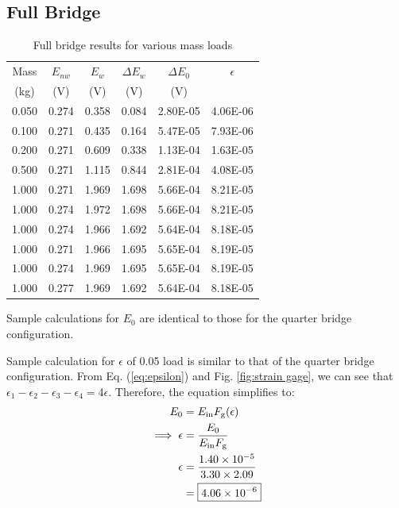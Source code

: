 \subsection{Full Bridge}

\begin{table}[h]
    \centering
    \caption{Full bridge results for various mass loads}
    \label{tab:Q1FullBridge}
    \begin{tabular}{cccccc}
        \toprule
        Mass & $E_{nw}$ & $E_w$ & $\Delta E_w$ & $\Delta E_0$ & $\epsilon$ \\
        (kg) & (V) & (V) & (V) & (V) & \\
        \midrule
        0.050 & 0.274 & 0.358 & 0.084 & 2.80E-05 & 4.06E-06 \\
        0.100 & 0.271 & 0.435 & 0.164 & 5.47E-05 & 7.93E-06 \\
        0.200 & 0.271 & 0.609 & 0.338 & 1.13E-04 & 1.63E-05 \\
        0.500 & 0.271 & 1.115 & 0.844 & 2.81E-04 & 4.08E-05 \\
        1.000 & 0.271 & 1.969 & 1.698 & 5.66E-04 & 8.21E-05 \\
        1.000 & 0.274 & 1.972 & 1.698 & 5.66E-04 & 8.21E-05 \\
        1.000 & 0.274 & 1.966 & 1.692 & 5.64E-04 & 8.18E-05 \\
        1.000 & 0.271 & 1.966 & 1.695 & 5.65E-04 & 8.19E-05 \\
        1.000 & 0.274 & 1.969 & 1.695 & 5.65E-04 & 8.19E-05 \\
        1.000 & 0.277 & 1.969 & 1.692 & 5.64E-04 & 8.18E-05 \\
        \bottomrule
    \end{tabular}
\end{table}

Sample calculations for $E_0$ are identical to those for the quarter bridge configuration.

Sample calculation for $\epsilon$ of 0.05 load is similar to that of the quarter bridge configuration. From Eq. (\ref{eq:epsilon}) and
Fig. \ref{fig:strain gage}, we can see that $\epsilon_1 - \epsilon_2  - \epsilon_3 - \epsilon_4 = 4 \epsilon$. Therefore, the equation simplifies to:
\begin{align*}
    E_0 &= E_{\text{in}} F_{\text{g}}
    (\epsilon) \\
    \implies \epsilon &= \frac{E_0}{E_{\text{in}} F_{\text{g}}} \\
    \epsilon &= \frac{1.40\times 10^{-5}}{3.30 \times 2.09} \\
     &= \boxed{\qty{4.06E-06}{}}
\end{align*}